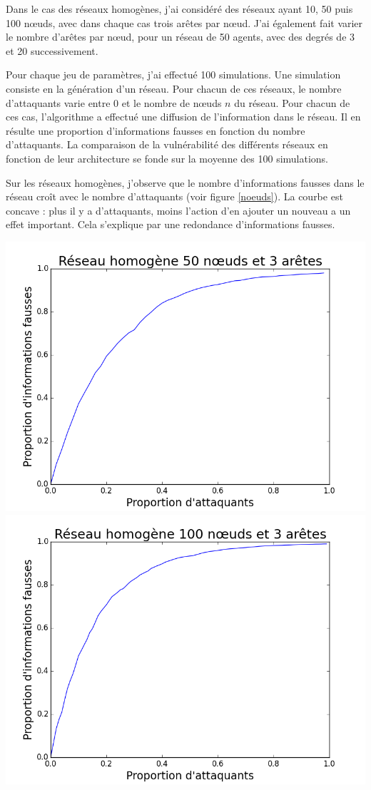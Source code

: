 \documentclass[12pt,a4paper]{article}
\begin{document}
Dans le cas des réseaux homogènes, j'ai considéré des réseaux ayant 10, 50 puis 100 nœuds, avec dans chaque cas trois arêtes par nœud.
J'ai également fait varier le nombre d'arêtes par nœud, pour un réseau de 50 agents, avec des degrés de 3 et 20 successivement.

Pour chaque jeu de paramètres, j'ai effectué 100 simulations.
Une simulation consiste en la génération d'un réseau.
Pour chacun de ces réseaux, le nombre d'attaquants varie entre 0 et le nombre de nœuds $n$ du réseau.
Pour chacun de ces cas, l'algorithme a effectué une diffusion de l'information dans le réseau.
Il en résulte une proportion d'informations fausses en fonction du nombre d'attaquants.
La comparaison de la vulnérabilité des différents réseaux en fonction de leur architecture se fonde sur la moyenne des 100 simulations. 


Sur les réseaux homogènes, j'observe que le nombre d'informations fausses dans le réseau croît avec le nombre d'attaquants (voir figure \ref{noeuds}).
La courbe est concave : plus il y a d’attaquants, moins l’action d’en ajouter un nouveau a un effet important.
Cela s'explique par une redondance d'informations fausses.

\begin{center}
\includegraphics[width=0.49\linewidth]{../resultats/atkaleat/atkaleat-50-3-2-i100.png}
\includegraphics[width=0.49\linewidth]{../resultats/atkaleat/atkaleat-100-3-1-i100.png}
 \label{noeuds}
\end{center}
\end{document}

